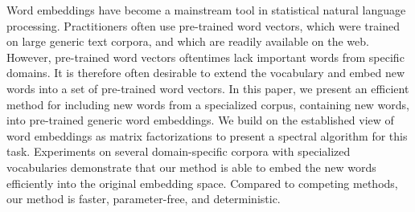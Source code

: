 Word embeddings have become a mainstream tool in statistical natural language processing.   Practitioners often use pre-trained word vectors, which were trained on large generic text corpora, and which are readily available on the web. However, pre-trained word vectors oftentimes lack important words from specific domains. It is therefore often desirable to extend the vocabulary and embed new words into a set of pre-trained word vectors. In this paper, we present an efficient method for including new words from a  specialized corpus, containing new words, into pre-trained generic word embeddings. We build on the established view of word embeddings as matrix factorizations to present a spectral algorithm for this task.  Experiments on several domain-specific corpora with specialized vocabularies demonstrate that our method is able to embed the new words efficiently into the original embedding space. Compared to competing methods, our method is faster, parameter-free, and deterministic.
